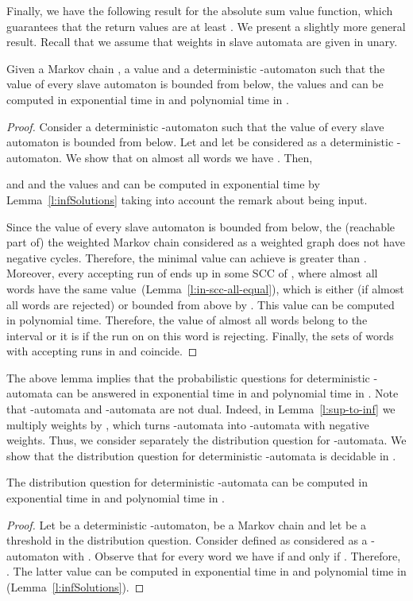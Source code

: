 \documentclass{lmcs}
\begin{document}
Finally, we have the following result for the absolute sum value function, which guarantees that the return values are at least . We present a slightly more general result.
Recall that we assume that weights in slave automata are given in unary.

\begin{lem}\label{l:bound-from-below}
Given a Markov chain , a value  and a deterministic -automaton
such that the value of every slave automaton is bounded from below,
the values  and  can be computed in exponential time in  and polynomial time in .
\end{lem}



\begin{proof}
Consider a deterministic -automaton  such that the value of every slave automaton is bounded from below.
Let  and let  be  considered as a deterministic -automaton.
We show that on almost all words  we have .
Then,

and  and the values
 and  can be computed in exponential time by
Lemma~\ref{l:infSolutions} taking into account the remark about  being input.

Since the value of every slave automaton  is bounded from below,
the (reachable part of) the weighted Markov chain  considered as a weighted graph does not have negative cycles.
Therefore, the minimal value  can achieve is greater than .
Moreover, every accepting run of  ends up in some SCC of , where
almost all words have the same value~(Lemma~\ref{l:in-scc-all-equal}), which
is either  (if almost all words are rejected) or bounded from above by . This value can be computed in polynomial time.
Therefore, the value of almost all words belong to the interval  or it is  if the run on  on this word is rejecting.
Finally, the sets of words with accepting runs in  and  coincide.
\end{proof}

The above lemma implies that the probabilistic questions for deterministic -automata can be answered in exponential time in  and polynomial time in .
Note that -automata and -automata are not dual.
Indeed, in Lemma~\ref{l:sup-to-inf} we multiply weights by , which turns -automata into -automata with negative weights.
Thus, we consider separately the distribution question for -automata.
We show that the distribution question for deterministic -automata is
decidable in .



\begin{lem}\label{l:distributionSumPlusDecidable}
The distribution question for deterministic -automata can be computed in exponential time in  and polynomial time in .
\end{lem}
\begin{proof}
Let  be a deterministic -automaton,  be a Markov chain and let  be a threshold in the distribution question.
Consider  defined as  considered as a -automaton with .
Observe that for every word  we have  if and only if
. Therefore,
.
The latter value can be computed in exponential time in  and polynomial time in  (Lemma~\ref{l:infSolutions}).
\end{proof}
\end{document}
